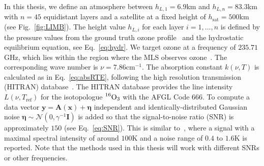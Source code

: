 In this thesis, we define an atmosphere between $h_{L,1} = 6.9$km and $h_{L,n} = 83.3$km with $n = 45$ equidistant layers and a satellite at a fixed height of $h_{\text{sat}} = 500$km (see Fig.~\ref{fig:LIMB}).
The height value $h_{L,i}$ for each layer $i = 1,\dots, n$ is defined by the pressure values from the ground truth ozone profile~\cite{MLSdata} and the hydrostatic equilibrium equation, see Eq.~\ref{eq:hydr}.
We target ozone at a frequency of $235.71$GHz, which lies within the region where the MLS observes ozone~\cite{livesey2008ozonecarbonmono, waters2006earth}.
The corresponding wave number is $\nu = 7.86\text{cm}^{-1}$.
The absorption constant $k(\nu,T)$ is calculated as in Eq.~\ref{eq:absRTE}, following the high resolution transmission (HITRAN) database~\cite{gordon2022hitran2020}.
The HITRAN database provides the line intensity $L(\nu,T_{\text{ref}})$ for the isotopologue $\prescript{16}{}{\text{O}}_3$ with the AFGL Code 666.
To compute a data vector $\bm{y} = \bm{A}(\bm{x}) + \bm{\eta} $ independent and identically-distributed Gaussian noise $\bm{\eta} \sim \mathcal{N}(0,\gamma^{-1} \bm{I})$ is added so that the signal-to-noise ratio (SNR) is approximately $150$ (see Eq.~\ref{eq:SNR}).
This is similar to~\cite{Froidevaux2008snrozone}, where a signal with a maximal spectral intensity of around $100\text{K}$ and a noise range of $0.4$ to $1.6\text{K}$ is reported.
Note that the methods used in this thesis will work with different SNRs or other frequencies.


